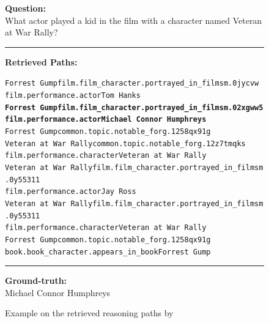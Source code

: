 \begin{figure}[t]
\begin{tcolorbox}[colback=gray!5!white,
                  colframe=gray!75!black,
                  title=CWQ-WebQTrn-962\_f0c57985929ee8b823983f6e5f104971]
\scriptsize

\textbf{Question:}\\
What actor played a kid in the film with a character named Veteran at War Rally?

\rule{\linewidth}{0.4pt}

\textbf{Retrieved Paths:}\\[2pt]
{\raggedright
\texttt{Forrest Gump\patharrow film.film\_character.portrayed\_in\_films\patharrow m.0jycvw\patharrow \\ film.performance.actor\patharrow Tom Hanks}\\[6pt]

\texttt{\textbf{Forrest Gump\patharrow film.film\_character.portrayed\_in\_films\patharrow m.02xgww5\patharrow  \\ film.performance.actor\patharrow Michael Connor Humphreys}}\\[6pt]

\texttt{Forrest Gump\patharrow common.topic.notable\_for\patharrow g.1258qx91g}\\[6pt]

\texttt{Veteran at War Rally\patharrow common.topic.notable\_for\patharrow g.12z7tmqks\patharrow \\ film.performance.character\patharrow Veteran at War Rally}\\[6pt]

\texttt{Veteran at War Rally\patharrow film.film\_character.portrayed\_in\_films\patharrow m.0y55311\patharrow \\ film.performance.actor\patharrow Jay Ross}\\[6pt]

\texttt{Veteran at War Rally\patharrow film.film\_character.portrayed\_in\_films\patharrow m.0y55311\patharrow \\ film.performance.character\patharrow Veteran at War Rally}\\[6pt]

\texttt{Forrest Gump\patharrow common.topic.notable\_for\patharrow g.1258qx91g\patharrow \\ book.book\_character.appears\_in\_book\patharrow Forrest Gump}\\[6pt]

\par}

\rule{\linewidth}{0.4pt}

\textbf{Ground-truth:}\\
Michael Connor Humphreys

\end{tcolorbox}
\caption{Example on the retrieved reasoning paths by \proj}
\label{fig:example6}
\end{figure}


